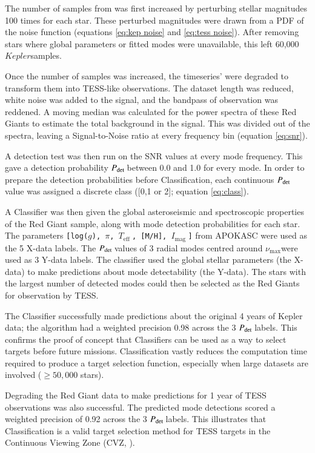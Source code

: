 \documentclass[a4paper,fleqn,usenatbib,useAMS]{mnras}
\newcommand{\numax}{\ensuremath{\nu_{\textrm{max}}}}
\newcommand{\teff}{\ensuremath{T_{\textrm{eff}}\:}}
\newcommand{\kep}{\ensuremath{Kepler}\:}
\newcommand{\pdet}{\ensuremath{P_{\rm det}\:}}
\newcommand{\imag}{\ensuremath{I_{\textrm{mag}}\:}}
\begin{document}
The number of samples from \citet{davies_asteroseismology_2016} was first increased by perturbing stellar magnitudes 100 times for each star. These perturbed magnitudes were drawn from a PDF of the noise function (equations \ref{eq:kep noise} and \ref{eq:tess noise}). After removing stars where global parameters or fitted modes were unavailable, this left 60,000 \kep samples. 

Once the number of samples was increased, the timeseries' were degraded to transform them into TESS-like observations. The dataset length was reduced, white noise was added to the signal, and the bandpass of observation was reddened. A moving median was calculated for the power spectra of these Red Giants to estimate the total background in the signal. This was divided out of the spectra, leaving a Signal-to-Noise ratio at every frequency bin (equation \ref{eq:snr}).

A detection test was then run on the SNR values at every mode frequency. This gave a detection probability \pdet between 0.0 and 1.0 for every mode. In order to prepare the detection probabilities before Classification, each continuous \pdet value was assigned a discrete class ([0,1 or 2]; equation \ref{eq:class}).

A Classifier was then given the global asteroseismic and spectroscopic properties of the Red Giant sample, along with mode detection probabilities for each star. The parameters \texttt{[log($g$), $\pi$, \teff, [M/H], \imag]} from APOKASC \citep{pinsonneault_apokasc_2014} were used as the 5 X-data labels. The \pdet values of 3 radial modes centred around \numax were used as 3 Y-data labels. %
The classifier used the global stellar parameters (the X-data) to make predictions about mode detectability (the Y-data). The stars with the largest number of detected modes could then be selected as the Red Giants for observation by TESS. 

The Classifier successfully made predictions about the original 4 years of Kepler data; the algorithm had a weighted precision 0.98 across the 3 \pdet labels. This confirms the proof of concept that Classifiers can be used as a way to select targets before future missions. Classification vastly reduces the computation time required to produce a target selection function, especially when large datasets are involved ($\geq50,000$ stars).

Degrading the Red Giant data to make predictions for 1 year of TESS observations was also successful. The predicted mode detections scored a weighted precision of 0.92 across the 3 \pdet labels. This illustrates that Classification is a valid target selection method for TESS targets in the Continuous Viewing Zone (CVZ, \citep{ricker_transiting_2014}).
\end{document}
